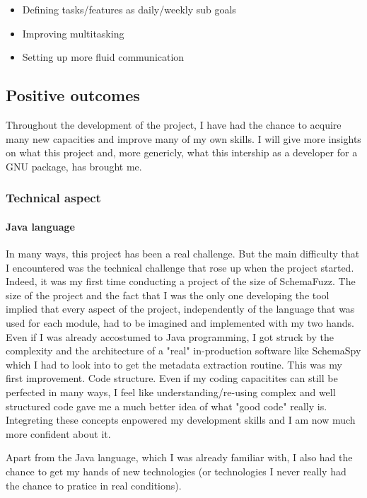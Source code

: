 \documentclass{article}
\begin{document}
	\begin{itemize}
	\item{Defining tasks/features as daily/weekly sub goals}
	\item{Improving multitasking} %
	\item{Setting up more fluid communication}
	\end{itemize}		

	\subsection{Positive outcomes}
Throughout the development of the project, I have had the chance to acquire many new capacities and improve many of my own skills. I will give more insights on what this project and, more genericly, what this intership as a developer for a GNU package, has brought me.

		\subsubsection{Technical aspect}
		
		\paragraph{Java language}
In many ways, this project has been a real challenge. But the main difficulty that I encountered was the technical challenge that rose up when the project started. Indeed, it was my first time conducting a project of the size of SchemaFuzz. The size of the project and the fact that I was the only one developing the tool implied that every aspect of the project, independently of the language that was used for each module, had to be imagined and implemented with my two hands.
Even if I was already accostumed to Java programming, I got struck by the complexity and the architecture of a "real" in-production software like SchemaSpy which I had to look into to get the metadata extraction routine.
This was my first improvement. Code structure. Even if my coding capacitites can still be perfected in many ways, I feel like understanding/re-using complex and well structured code gave me a much better idea of what "good code" really is. Integreting these concepts enpowered my development skills and I am now much more confident about it.

Apart from the Java language, which I was already familiar with, I also had the chance to get my hands of new technologies (or technologies I never really had the chance to pratice in real conditions). 
\end{document}
